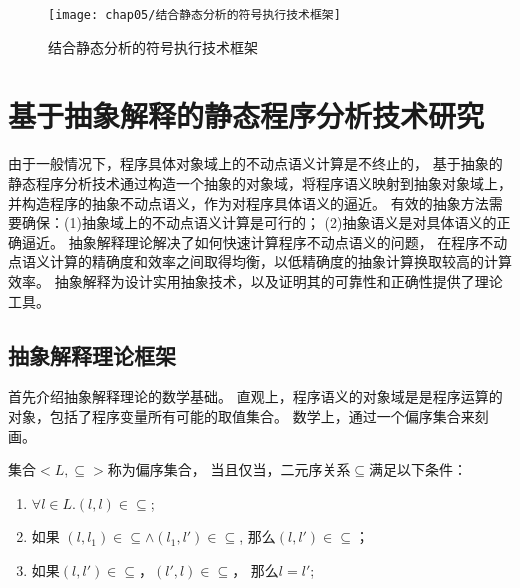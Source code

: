 \begin{figure}[h]
	\centering
	\texttt{[image: chap05/结合静态分析的符号执行技术框架]}
	\caption{结合静态分析的符号执行技术框架}
	\label{fig-framework}
\end{figure}




\section{基于抽象解释的静态程序分析技术研究}
\label{sec-absint}

由于一般情况下，程序具体对象域上的不动点语义计算是不终止的，
基于抽象的静态程序分析技术通过构造一个抽象的对象域，将程序语义映射到抽象对象域上，
并构造程序的抽象不动点语义，作为对程序具体语义的逼近。
有效的抽象方法需要确保：(1)抽象域上的不动点语义计算是可行的；
(2)抽象语义是对具体语义的正确逼近。
抽象解释理论解决了如何快速计算程序不动点语义的问题，
在程序不动点语义计算的精确度和效率之间取得均衡，以低精确度的抽象计算换取较高的计算效率。
抽象解释为设计实用抽象技术，以及证明其的可靠性和正确性提供了理论工具。




\subsection{抽象解释理论框架}

首先介绍抽象解释理论的数学基础。
直观上，程序语义的对象域是是程序运算的对象，包括了程序变量所有可能的取值集合。
数学上，通过一个偏序集合来刻画。

\begin{definition}
集合$<L, \subseteq>$称为偏序集合，
当且仅当，二元序关系$\subseteq$满足以下条件：
\begin{enumerate}
\item $\forall l \in L. (l,l)\in \subseteq$;
\item 如果 $(l,l_1)\in \subseteq \wedge (l_1, l')\in \subseteq$,
	那么$(l,l')\in \subseteq$；
\item 如果$(l,l')\in \subseteq$，$(l',l)\in \subseteq$，
	那么$l = l'$;
\end{enumerate}
\end{definition}


